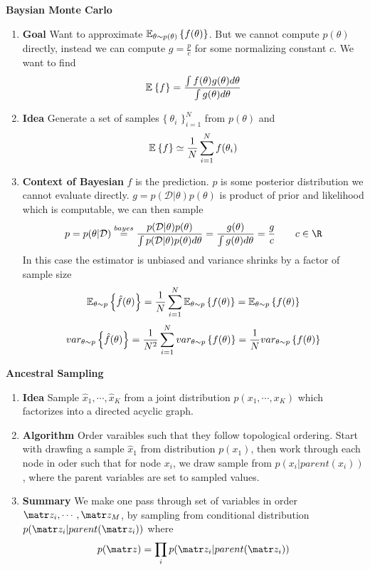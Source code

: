\documentclass[11pt]{article}
\begin{document}
\begin{defn*}
    \textbf{Baysian Monte Carlo}
    \begin{enumerate}
        \item \textbf{Goal} Want to approximate $\E[\theta \sim p(\theta)]{f(\theta)}$. But we cannot compute $p(\theta)$ directly, instead we can compute $g = \textstyle \frac{p}{c}$ for some normalizing constant $c$. We want to find 
        \[ 
            \E{f} = \frac{\int f(\theta) g(\theta) d\theta}{\int g(\theta) d\theta}    
        \]
        \item \textbf{Idea} Generate a set of samples $\{\ \theta_i \,\, \}_{i=1}^N$ from $p(\theta)$ and 
        \[
            \E{f} \simeq  \frac{1}{N} \sum_{i=1}^Nf(\theta_i)
        \]
        \item \textbf{Context of Bayesian} $f$ is the prediction. $p$ is some posterior distribution we cannot evaluate directly. $g = p(\mathcal{D} | \theta) p(\theta)$ is product of prior and likelihood which is computable, we can then sample 
        \[  
            p = p(\theta | \mathcal{D}) \overset{bayes}{=}
            \frac{p(\mathcal{D} | \theta) p(\theta)}{\int p(\mathcal{D} | \theta) p(\theta) d\theta}
            = \frac{g(\theta)}{\int g(\theta)d\theta}
            = \frac{g}{c}
            \qquad c\in \R
        \]
        In this case the estimator is unbiased and variance shrinks by a factor of sample size
        \[
            \E[\theta \sim p]{\hat{f}(\theta)} = \frac{1}{N} \sum_{i=1}^N \E[\theta \sim p]{f(\theta)} = \E[\theta\sim p]{f(\theta)}
        \]
        \[
            \var[\theta \sim p]{\hat{f}(\theta)} = \frac{1}{N^2} \sum_{i=1}^N \var[\theta \sim p]{f(\theta)} = \frac{1}{N}\var[\theta\sim p]{f(\theta)}
        \]
    \end{enumerate}
\end{defn*}


\begin{defn*}
    \textbf{Ancestral Sampling} 
    \begin{enumerate}
        \item \textbf{Idea} Sample $\hat{x}_1, \cdots, \hat{x}_K$ from a joint distribution $p(x_1, \cdots, x_K)$ which factorizes into a directed acyclic graph. 
        \item \textbf{Algorithm} Order varaibles such that they follow topological ordering. Start with drawfing a sample $\hat{x}_1$ from distribution $p(x_1)$, then work through each node in oder such that for node $x_i$, we draw sample from $p(x_i | parent(x_i))$, where the parent variables are set to sampled values. 
        \item \textbf{Summary} We make one pass through set of variables in order $\bz_i , \cdots, \bz_M$, by sampling from conditional distribution $p(\bz_i | parent(\bz_i))$ where 
        \[
            p(\bz)=  \prod_{i} p(\bz_i | parent(\bz_i))    
        \]
    \end{enumerate}
\end{defn*}
\end{document}
